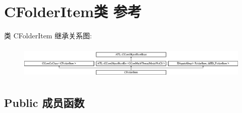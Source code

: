 \hypertarget{class_c_folder_item}{}\section{C\+Folder\+Item类 参考}
\label{class_c_folder_item}
类 C\+Folder\+Item 继承关系图\+:\begin{figure}[H]
\begin{center}
\leavevmode
\includegraphics[height=1.590909cm]{class_c_folder_item}
\end{center}
\end{figure}
\subsection*{Public 成员函数}
